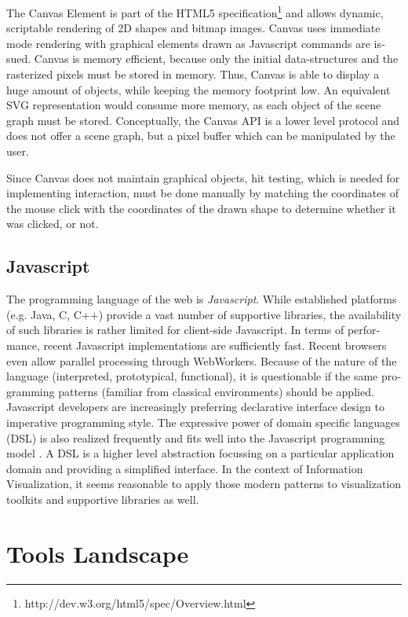 \begin{english}
The Canvas Element is part of the HTML5 specification\footnote{http://dev.w3.org/html5/spec/Overview.html} and allows dynamic, scriptable rendering of 2D shapes and bitmap images. Canvas uses immediate mode rendering with graphical elements drawn as Javascript commands are issued. Canvas is memory efficient, because only the initial data-structures and the rasterized pixels must be stored in memory. Thus, Canvas is able to display a huge amount of objects, while keeping the memory footprint low. An equivalent SVG representation would consume more memory, as each object of the scene graph must be stored. Conceptually, the Canvas API is a lower level protocol and does not offer a scene graph, but a pixel buffer which can be manipulated by the user.

Since Canvas does not maintain graphical objects, hit testing, which is needed for implementing interaction, must be done manually by matching the coordinates of the mouse click with the coordinates of the drawn shape to determine whether it was clicked, or not.


\subsection{Javascript}

The programming language of the web is \emph{Javascript}. While established platforms (e.g. Java, C, C++) provide a vast number of supportive libraries, the availability of such libraries is rather limited for client-side Javascript. In terms of performance, recent Javascript implementations are sufficiently fast. Recent browsers even allow parallel processing through WebWorkers. Because of the nature of the language (interpreted, prototypical, functional), it is questionable if the same programming patterns (familiar from classical environments) should be applied. Javascript developers are increasingly preferring declarative interface design to imperative programming style. The expressive power of domain specific languages (DSL) is also realized frequently and fits well into the Javascript programming model \cite{deursen2000}. A DSL is a higher level abstraction focussing on a particular application domain and providing a simplified interface. In the context of Information Visualization, it seems reasonable to apply those modern patterns to visualization toolkits and supportive libraries as well.

\section{Tools Landscape}


\end{english}
